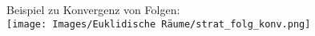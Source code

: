 \begin{example}
    Beispiel zu Konvergenz von Folgen: \\\texttt{[image: Images/Euklidische Räume/strat\_folg\_konv.png]}
\end{example} 